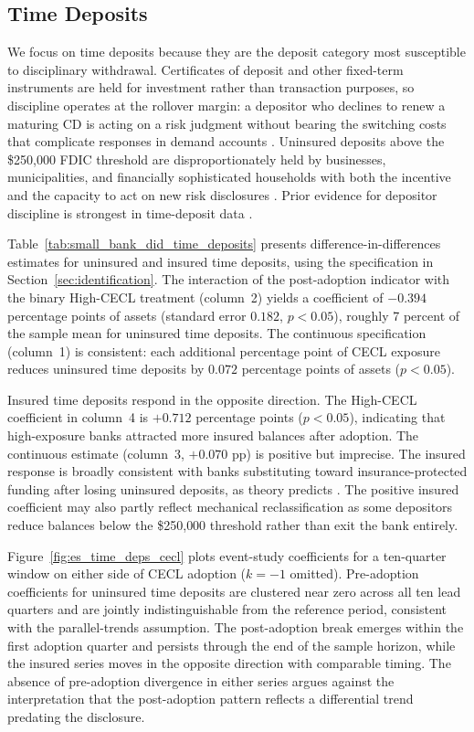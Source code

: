 \subsection{Time Deposits}
\label{sec:results:time_deposits}

We focus on time deposits because they are the deposit category most susceptible
to disciplinary withdrawal.  Certificates of deposit and other fixed-term
instruments are held for investment rather than transaction purposes, so discipline
operates at the rollover margin: a depositor who declines to renew a maturing CD
is acting on a risk judgment without bearing the switching costs that complicate
responses in demand accounts \citep{calomiris1991role, iyer2016tale}.  Uninsured
deposits above the \$250{,}000 FDIC threshold are disproportionately held by
businesses, municipalities, and financially sophisticated households with both
the incentive and the capacity to act on new risk disclosures \citep{flannery1998using,
gee2022decision}.  Prior evidence for depositor discipline is strongest in
time-deposit data \citep{maechler2006dynamic, egan2017deposit}.

Table~\ref{tab:small_bank_did_time_deposits} presents difference-in-differences
estimates for uninsured and insured time deposits, using the specification in
Section~\ref{sec:identification}.  The interaction of the post-adoption indicator
with the binary High-CECL treatment (column~2) yields a coefficient of $-0.394$
percentage points of assets (standard error $0.182$, $p < 0.05$), roughly 7
percent of the sample mean for uninsured time deposits.  The continuous
specification (column~1) is consistent: each additional percentage point of CECL
exposure reduces uninsured time deposits by $0.072$ percentage points of assets
($p < 0.05$).

Insured time deposits respond in the opposite direction.  The High-CECL
coefficient in column~4 is $+0.712$ percentage points ($p < 0.05$), indicating
that high-exposure banks attracted more insured balances after adoption.  The
continuous estimate (column~3, $+0.070$ pp) is positive but imprecise.  The
insured response is broadly consistent with banks substituting toward
insurance-protected funding after losing uninsured deposits, as theory predicts
\citep{calomiris1991role}.  The positive insured coefficient may also partly
reflect mechanical reclassification as some depositors reduce balances below the
\$250{,}000 threshold rather than exit the bank entirely.

Figure~\ref{fig:es_time_deps_cecl} plots event-study coefficients for a
ten-quarter window on either side of CECL adoption ($k = -1$ omitted).
Pre-adoption coefficients for uninsured time deposits are clustered near zero
across all ten lead quarters and are jointly indistinguishable from the reference
period, consistent with the parallel-trends assumption.  The post-adoption break
emerges within the first adoption quarter and persists through the end of the
sample horizon, while the insured series moves in the opposite direction with
comparable timing.  The absence of pre-adoption divergence in either series
argues against the interpretation that the post-adoption pattern reflects a
differential trend predating the disclosure.


